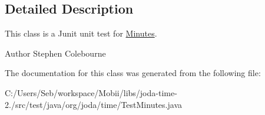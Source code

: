 \subsection{Detailed Description}
This class is a Junit unit test for \hyperlink{classorg_1_1joda_1_1time_1_1_minutes}{Minutes}.

\begin{DoxyAuthor}{Author}
Stephen Colebourne 
\end{DoxyAuthor}


The documentation for this class was generated from the following file\-:\begin{DoxyCompactItemize}
\item 
C\-:/\-Users/\-Seb/workspace/\-Mobii/libs/joda-\/time-\/2./src/test/java/org/joda/time/Test\-Minutes.\-java\end{DoxyCompactItemize}
